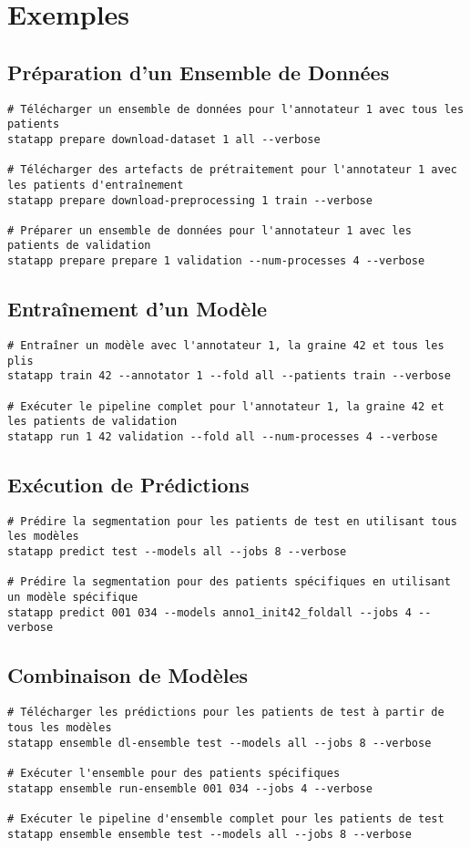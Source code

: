 \documentclass{article}
\begin{document}
\section{Exemples}

\subsection{Préparation d'un Ensemble de Données}
\begin{lstlisting}
# Télécharger un ensemble de données pour l'annotateur 1 avec tous les patients
statapp prepare download-dataset 1 all --verbose

# Télécharger des artefacts de prétraitement pour l'annotateur 1 avec les patients d'entraînement
statapp prepare download-preprocessing 1 train --verbose

# Préparer un ensemble de données pour l'annotateur 1 avec les patients de validation
statapp prepare prepare 1 validation --num-processes 4 --verbose
\end{lstlisting}

\subsection{Entraînement d'un Modèle}
\begin{lstlisting}
# Entraîner un modèle avec l'annotateur 1, la graine 42 et tous les plis
statapp train 42 --annotator 1 --fold all --patients train --verbose

# Exécuter le pipeline complet pour l'annotateur 1, la graine 42 et les patients de validation
statapp run 1 42 validation --fold all --num-processes 4 --verbose
\end{lstlisting}

\subsection{Exécution de Prédictions}
\begin{lstlisting}
# Prédire la segmentation pour les patients de test en utilisant tous les modèles
statapp predict test --models all --jobs 8 --verbose

# Prédire la segmentation pour des patients spécifiques en utilisant un modèle spécifique
statapp predict 001 034 --models anno1_init42_foldall --jobs 4 --verbose
\end{lstlisting}

\subsection{Combinaison de Modèles}
\begin{lstlisting}
# Télécharger les prédictions pour les patients de test à partir de tous les modèles
statapp ensemble dl-ensemble test --models all --jobs 8 --verbose

# Exécuter l'ensemble pour des patients spécifiques
statapp ensemble run-ensemble 001 034 --jobs 4 --verbose

# Exécuter le pipeline d'ensemble complet pour les patients de test
statapp ensemble ensemble test --models all --jobs 8 --verbose
\end{lstlisting}
\end{document}
